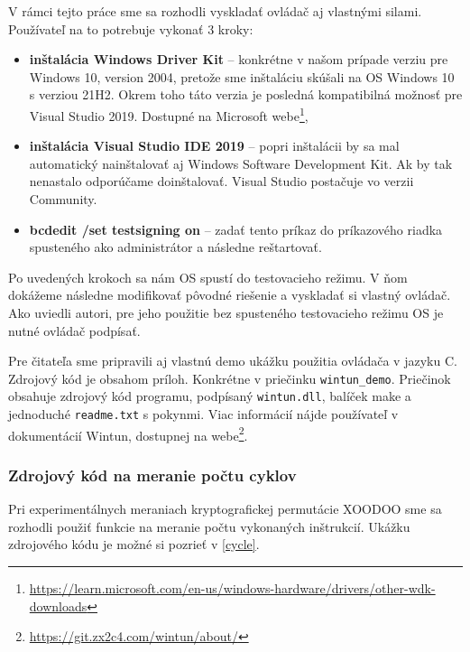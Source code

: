 V rámci tejto práce sme sa rozhodli vyskladať ovládač aj vlastnými silami. Používateľ na to potrebuje vykonať 3 kroky: 
\begin{itemize}
	\item\textbf{inštalácia Windows Driver Kit} -- konkrétne v našom prípade verziu pre Windows 10, version 2004, pretože sme inštaláciu skúšali na OS Windows 10 s verziou 21H2. Okrem toho táto verzia je posledná kompatibilná možnosť pre Visual Studio 2019. Dostupné na Microsoft webe\footnote{\url{https://learn.microsoft.com/en-us/windows-hardware/drivers/other-wdk-downloads}},
	\item\textbf{inštalácia Visual Studio IDE 2019} -- popri inštalácii by sa mal automatický nainštalovať aj Windows Software Development Kit. Ak by tak nenastalo odporúčame doinštalovať. Visual Studio postačuje vo verzii Community.  
	\item\textbf{bcdedit /set testsigning on} -- zadať tento príkaz do príkazového riadka spusteného ako administrátor a následne reštartovať. 
\end{itemize}  
Po uvedených krokoch sa nám OS spustí do testovacieho režimu. V ňom dokážeme následne modifikovať pôvodné riešenie a vyskladať si vlastný ovládač. Ako uviedli autori, pre jeho použitie bez spusteného testovacieho režimu OS je nutné ovládač podpísať. 

Pre čitateľa sme pripravili aj vlastnú demo ukážku použitia ovládača v jazyku C. Zdrojový kód je obsahom príloh. Konkrétne v priečinku \lstinline|wintun_demo|. Priečinok obsahuje zdrojový kód programu, podpísaný \lstinline|wintun.dll|, balíček make a jednoduché \lstinline|readme.txt| s pokynmi.
Viac informácií nájde používateľ v dokumentácií Wintun, dostupnej na webe\footnote{\url{https://git.zx2c4.com/wintun/about/}}.
   
\subsubsection{Zdrojový kód na meranie počtu cyklov} 
Pri experimentálnych meraniach kryptografickej permutácie XOODOO sme sa rozhodli použiť funkcie na meranie počtu vykonaných inštrukcií. Ukážku zdrojového kódu je možné si pozrieť v \ref{cycle}.

